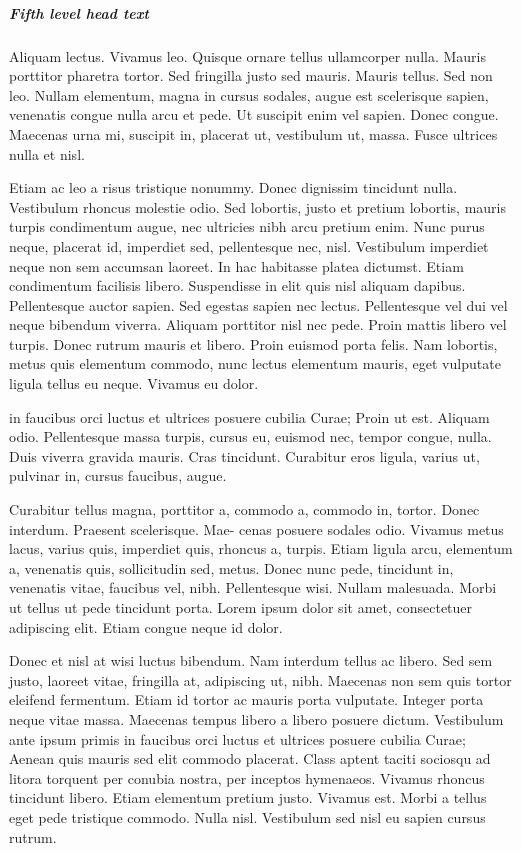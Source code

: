 \documentclass[CJCE,STIX2COL]{WileyNJD-v2}
\begin{document}
\subparagraph{Fifth level head text}

Aliquam lectus. Vivamus leo. Quisque ornare tellus ullamcorper nulla. Mauris porttitor pharetra
tortor. Sed fringilla justo sed mauris. Mauris tellus. Sed non leo. Nullam elementum, magna in cursus sodales, augue
est scelerisque sapien, venenatis congue nulla arcu et pede. Ut suscipit enim vel sapien. Donec congue. Maecenas
urna mi, suscipit in, placerat ut, vestibulum ut, massa. Fusce ultrices nulla et nisl.

Etiam ac leo a risus tristique nonummy. Donec dignissim tincidunt nulla. Vestibulum rhoncus molestie odio. Sed
lobortis, justo et pretium lobortis, mauris turpis condimentum augue, nec ultricies nibh arcu pretium enim. Nunc
purus neque, placerat id, imperdiet sed, pellentesque nec, nisl. Vestibulum imperdiet neque non sem accumsan laoreet.
In hac habitasse platea dictumst. Etiam condimentum facilisis libero. Suspendisse in elit quis nisl aliquam dapibus.
Pellentesque auctor sapien. Sed egestas sapien nec lectus. Pellentesque vel dui vel neque bibendum viverra. Aliquam
porttitor nisl nec pede. Proin mattis libero vel turpis. Donec rutrum mauris et libero. Proin euismod porta felis.
Nam lobortis, metus quis elementum commodo, nunc lectus elementum mauris, eget vulputate ligula tellus eu neque.
Vivamus eu dolor.

in faucibus orci luctus et ultrices posuere cubilia Curae; Proin ut est. Aliquam odio. Pellentesque massa turpis, cursus
eu, euismod nec, tempor congue, nulla. Duis viverra gravida mauris. Cras tincidunt. Curabitur eros ligula, varius ut,
pulvinar in, cursus faucibus, augue.

Curabitur tellus magna, porttitor a, commodo a, commodo in, tortor. Donec interdum. Praesent scelerisque. Mae-
cenas posuere sodales odio. Vivamus metus lacus, varius quis, imperdiet quis, rhoncus a, turpis. Etiam ligula arcu,
elementum a, venenatis quis, sollicitudin sed, metus. Donec nunc pede, tincidunt in, venenatis vitae, faucibus vel,
nibh. Pellentesque wisi. Nullam malesuada. Morbi ut tellus ut pede tincidunt porta. Lorem ipsum dolor sit amet,
consectetuer adipiscing elit. Etiam congue neque id dolor.

Donec et nisl at wisi luctus bibendum. Nam interdum tellus ac libero. Sed sem justo, laoreet vitae, fringilla at,
adipiscing ut, nibh. Maecenas non sem quis tortor eleifend fermentum. Etiam id tortor ac mauris porta vulputate.
Integer porta neque vitae massa. Maecenas tempus libero a libero posuere dictum. Vestibulum ante ipsum primis in
faucibus orci luctus et ultrices posuere cubilia Curae; Aenean quis mauris sed elit commodo placerat. Class aptent
taciti sociosqu ad litora torquent per conubia nostra, per inceptos hymenaeos. Vivamus rhoncus tincidunt libero.
Etiam elementum pretium justo. Vivamus est. Morbi a tellus eget pede tristique commodo. Nulla nisl. Vestibulum
sed nisl eu sapien cursus rutrum.
\end{document}
